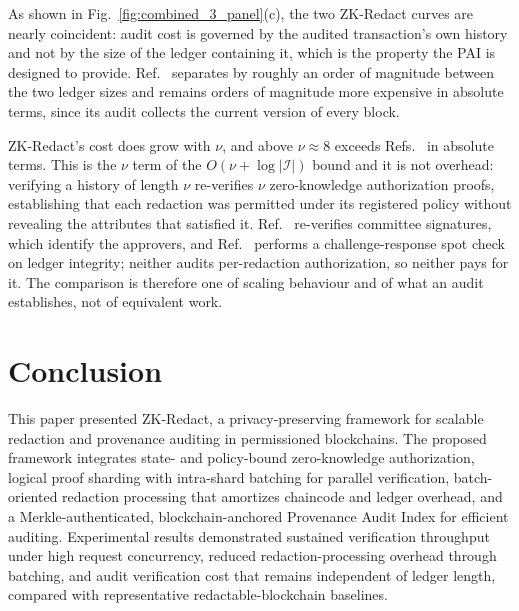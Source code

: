\documentclass[lettersize,journal]{IEEEtran}
\begin{document}
As shown in Fig.~\ref{fig:combined_3_panel}(c), the two ZK-Redact curves
are nearly coincident: audit cost is governed by the audited transaction's
own history and not by the size of the ledger containing it, which is the
property the PAI is designed to provide. Ref.~\cite{ref22} separates by
roughly an order of magnitude between the two ledger sizes and remains
orders of magnitude more expensive in absolute terms, since its audit
collects the current version of every block.

ZK-Redact's cost does grow with $\nu$, and above $\nu\approx8$ exceeds
Refs.~\cite{ref10,ref13} in absolute terms. This is the $\nu$ term of the
$O(\nu+\log|\mathcal{I}|)$ bound and it is not overhead: verifying a
history of length $\nu$ re-verifies $\nu$ zero-knowledge authorization
proofs, establishing that each redaction was permitted under its
registered policy without revealing the attributes that satisfied it.
Ref.~\cite{ref10} re-verifies committee signatures, which identify the
approvers, and Ref.~\cite{ref13} performs a challenge-response spot check
on ledger integrity; neither audits per-redaction authorization, so
neither pays for it. The comparison is therefore one of scaling behaviour
and of what an audit establishes, not of equivalent work.

\section{Conclusion}

This paper presented ZK-Redact, a privacy-preserving framework for scalable redaction and provenance auditing in permissioned blockchains. The proposed framework integrates state- and policy-bound zero-knowledge authorization, logical proof sharding with intra-shard batching for parallel verification, batch-oriented redaction processing that amortizes chaincode and ledger overhead,
and a Merkle-authenticated, blockchain-anchored Provenance Audit Index for efficient auditing. Experimental results demonstrated sustained verification throughput under high request concurrency, reduced redaction-processing overhead through batching, and audit verification cost that remains independent of ledger length, compared with representative redactable-blockchain baselines. 
\end{document}
